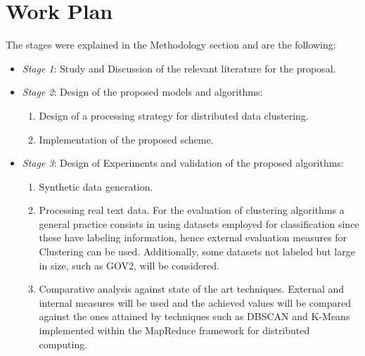 \documentclass[10pt]{article}
\begin{document}
\section{Work Plan}
The stages were explained in the Methodology section and are the following:
\begin{itemize}
\item \textit{Stage 1}: %
Study and Discussion of the relevant literature for the proposal.
\item \textit{Stage 2}: %
Design of the proposed models and algorithms: 
\begin{enumerate}
\item %
Design of a processing strategy for distributed data clustering.
\item %
Implementation of the proposed scheme.
\end{enumerate}
\item \textit{Stage 3}: %
    Design of Experiments and validation of the proposed algorithms: 
\begin{enumerate}
\item %
    Synthetic data generation.
\item %
    Processing real text data. For the evaluation of clustering algorithms a general practice consists in using datasets employed for classification since these have labeling information, hence external evaluation measures for Clustering can be used. Additionally, some datasets not labeled but large in size, such as GOV2, will be considered. 
\item %
    Comparative analysis against state of the art techniques. External and internal measures will be used and the achieved values will be compared against the ones attained by techniques such as DBSCAN and K-Means implemented within the MapReduce framework for distributed computing. 


\end{enumerate}
\end{itemize}
\end{document}
